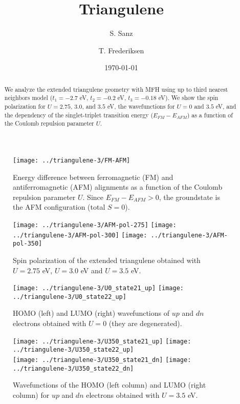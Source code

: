 \documentclass[twocolumn,amsmath,%
amssymb,prb,superscriptaddress]{revtex4}
\begin{document}
\title{Triangulene}

\author{S. Sanz}

\author{T. Frederiksen}

\date{\today}

\begin{abstract}
We analyze the extended triangulene geometry with MFH using up to third nearest neighbors model ($t_{1}=-2.7$ eV, $t_{2}=-0.2$ eV, $t_{3}=-0.18$ eV). We show the spin polarization for $U=2.75$, $3.0$, and $3.5$ eV, the wavefunctions for $U=0$ and $3.5$ eV, and the dependency of the singlet-triplet transition energy ($E_{FM}-E_{AFM}$) as a function of the Coulomb repulsion parameter $U$.
\end{abstract}

\maketitle


\begin{figure*}
	\texttt{[image: ../triangulene-3/FM-AFM]}
	\caption{Energy difference between ferromagnetic (FM) and antiferromagnetic (AFM) alignments as a function of the Coulomb repulsion parameter $U$. Since $E_{FM}-E_{AFM}>0$, the groundstate is the AFM configuration (total $S=0$).}
\end{figure*}

\begin{figure*}
	\texttt{[image: ../triangulene-3/AFM-pol-275]}
	\texttt{[image: ../triangulene-3/AFM-pol-300]}	
	\texttt{[image: ../triangulene-3/AFM-pol-350]}
	\caption{Spin polarization of the extended triangulene obtained with $U=2.75$ eV, $U=3.0$ eV and $U=3.5$ eV.}
\end{figure*}

\begin{figure*}
	\texttt{[image: ../triangulene-3/U0\_state21\_up]}
	\texttt{[image: ../triangulene-3/U0\_state22\_up]}
	\caption{HOMO (left) and LUMO (right) wavefunctions of $up$ and $dn$ electrons obtained with $U=0$ (they are degenerated).}
\end{figure*}

\begin{figure*}
	\texttt{[image: ../triangulene-3/U350\_state21\_up]}
	\texttt{[image: ../triangulene-3/U350\_state22\_up]}\\
	\texttt{[image: ../triangulene-3/U350\_state21\_dn]}
	\texttt{[image: ../triangulene-3/U350\_state22\_dn]}
	\caption{Wavefunctions of the HOMO (left column) and LUMO (right column) for $up$ and $dn$ electrons obtained with $U=3.5$ eV.} 
\end{figure*}
\end{document}
